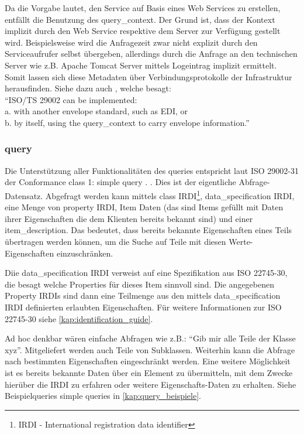 Da die Vorgabe lautet, den Service auf Basis eines Web Services zu erstellen, entfällt die Benutzung des query\_context. Der Grund ist, dass der Kontext  implizit durch den Web Service respektive dem Server zur Verfügung gestellt wird. Beispielsweise wird die Anfragezeit zwar nicht explizit durch den Serviceaufrufer selbst übergeben, allerdings durch die Anfrage an den technischen Server wie z.B. Apache Tomcat Server mittels Logeintrag implizit ermittelt. Somit lassen sich diese Metadaten über Verbindungsprotokolle der Infrastruktur herausfinden.  
Siehe dazu auch \citep[Kap. 6][]{iso29002-31}, welche besagt: \\ \enquote{ISO/TS 29002 can be implemented: \\
a. with another envelope standard, such as EDI, or \\
b. by itself, using the query\_context to carry envelope information.}

\subsubsection{query}
Die Unterstützung aller Funktionalitäten des queries entspricht laut ISO 29002-31 der Conformance class 1: simple query \citep[Anhang 6][]{iso29002-31}. .
Dies ist der eigentliche Abfrage-Datensatz. Abgefragt werden kann mittels class IRDI\footnote{IRDI  - International registration data identifier}, data\_specification IRDI, eine Menge von property IRDI, Item Daten (das sind Items gefüllt mit Daten ihrer Eigenschaften die dem Klienten bereits bekannt sind) und einer item\_description. Das bedeutet, dass bereits bekannte Eigenschaften eines Teils übertragen werden können, um die Suche auf Teile mit diesen Werte-Eigenschaften einzuschränken.

Diie data\_specification IRDI verweist auf eine Spezifikation aus ISO 22745-30, die besagt welche Properties für dieses Item sinnvoll sind. Die angegebenen Property IRDIs sind dann eine Teilmenge aus den mittels data\_specification IRDI definierten erlaubten Eigenschaften. Für weitere Informationen zur ISO 22745-30 siehe \autoref{kap:identification_guide}. 

Ad hoc denkbar wären einfache Abfragen wie z.B.: \enquote{Gib mir alle Teile der Klasse xyz}. Mitgeliefert werden auch Teile von Subklassen. Weiterhin kann die Abfrage nach bestimmten Eigenschaften eingeschränkt werden. Eine weitere Möglichkeit ist es bereits bekannte Daten über ein Element zu übermitteln, mit dem Zwecke hierüber die IRDI zu erfahren oder weitere Eigenschafts-Daten zu erhalten. Siehe Beispielqueries simple queries in \autoref{kap:query_beispiele}. 


